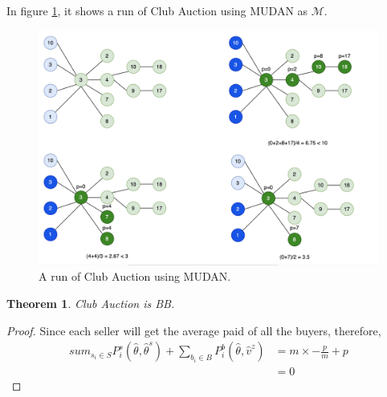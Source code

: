\documentclass[format=acmsmall, review=false, natbib=false]{acmart}
\newtheorem{theorem}{Theorem}[section]
\begin{document}
In figure \ref{fig:MUDAN}, it shows a run of Club Auction using MUDAN\cite{MUDAN-MUDAR} as \(\mathcal{M}\).

\begin{figure}
	\centering
	\includegraphics[width = \textwidth]{image/MUDAN.png}
	\caption{A run of Club Auction using MUDAN.}
	\label{fig:MUDAN}
\end{figure}

\begin{theorem}
	Club Auction is BB.
\end{theorem}
\begin{proof}
	Since each seller will get the average paid of all the buyers, therefore,
	\begin{align*}
		sum_{s_i \in S}P^s_i(\hat\theta, \hat\theta^s) + \sum_{b_i \in B}P_i^b(\hat\theta,\hat v^z)
		 & = m \times - \frac{p}{m} + p \\
		 & = 0
	\end{align*}
\end{proof}
\end{document}
